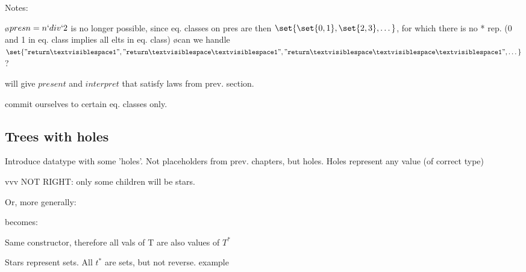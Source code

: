 Notes:

\bl
\o $pres n = n `div` 2$ is no longer possible, since eq. classes on pres are then $\set{\set{0,1},\set{2,3}, \dots }$, for which there is no * rep. (0 and 1 in eq. class implies all elts in eq. class)
\o can we handle $\set{ {\tt "return\spc1" },{\tt "return\spc\spc1" }, {\tt "return\spc\spc\spc1" }, \dots}$?
\el 

will give $present$ and $interpret$ that satisfy laws from prev. section.

commit ourselves to certain eq. classes only.






\subsection{Trees with holes}
Introduce datatype with some 'holes'. Not placeholders from prev. chapters, but holes. Holes represent any value (of correct type)


vvv NOT RIGHT: only some children will be stars.

%
%
%
%
%

Or, more generally:

becomes:

Same constructor, therefore all vals of T are also values of $T^*$

Stars represent sets. All $t^*$ are sets, but not reverse. example

 

